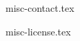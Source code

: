 \documentclass{cursuspresentatie}
\def\importslide#1#2{%
    {#2}
}
\begin{document}









\importslide{misc}{misc-contact.tex}


\ifishandout
    \importslide{misc}{misc-license.tex}
\fi
    
\end{document}
